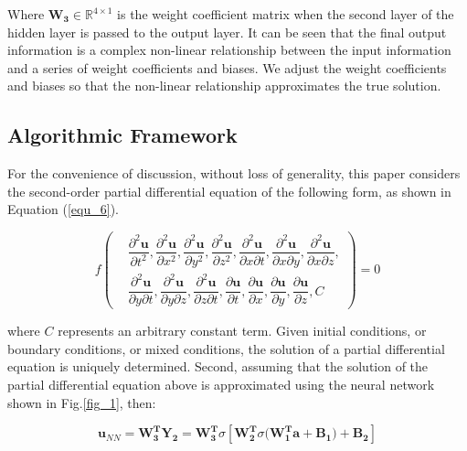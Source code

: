 \documentclass[10pt,journal,compsoc]{IEEEtran}
\begin{document}
Where $\mathbf{W_{3}} \in \mathbb{R}^{4 \times 1}$ is the weight coefficient matrix when the second layer of the hidden layer is passed to the output layer. It can be seen that the final output information is a complex non-linear relationship between the input information and a series of weight coefficients and biases. We adjust the weight coefficients and biases so that the non-linear relationship approximates the true solution.

\subsection{Algorithmic Framework}

For the convenience of discussion, without loss of generality, this paper considers the second-order partial differential equation of the following form, as shown in Equation (\ref{equ_6}).

\begin{equation}
f \left (
\begin{aligned}
&\dfrac{\partial^{2} \mathbf{u}}{\partial{t^2}},
\dfrac{\partial^{2} \mathbf{u}}{\partial{x^2}},
\dfrac{\partial^{2} \mathbf{u}}{\partial{y^2}},
\dfrac{\partial^{2} \mathbf{u}}{\partial{z^2}},
\dfrac{\partial^{2} \mathbf{u}}{\partial{x}\partial{t}},
\dfrac{\partial^{2} \mathbf{u}}{\partial{x}\partial{y}},
\dfrac{\partial^{2} \mathbf{u}}{\partial{x}\partial{z}},\\
&\dfrac{\partial^{2} \mathbf{u}}{\partial{y}\partial{t}},
\dfrac{\partial^{2} \mathbf{u}}{\partial{y}\partial{z}},
\dfrac{\partial^{2} \mathbf{u}}{\partial{z}\partial{t}},
\dfrac{\partial \mathbf{u}}{\partial{t}},
\dfrac{\partial \mathbf{u}}{\partial{x}},
\dfrac{\partial \mathbf{u}}{\partial{y}},
\dfrac{\partial \mathbf{u}}{\partial{z}},
C
\end{aligned}
\right ) = 0
\label{equ_6}
\end{equation}

where $C$ represents an arbitrary constant term. Given initial conditions, or boundary conditions, or mixed conditions, the solution of a partial differential equation is uniquely determined. Second, assuming that the solution of the partial differential equation above is approximated using the neural network shown in Fig.\ref{fig_1}, then:



\begin{equation}
\mathbf{u}_{NN} = \mathbf{W_{3}^{T} Y_{2}} = \mathbf{W_{3}^{T}} \sigma{[\mathbf{W_{2}^{T}} \sigma{(\mathbf{W_{1}^{T}a + \mathbf{B_{1}})}} + \mathbf{B_2}]}
\label{equ_7}
\end{equation}
\end{document}
